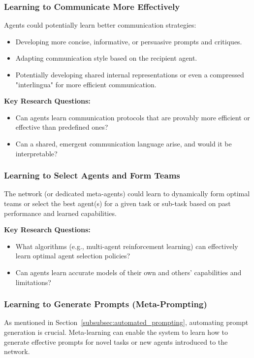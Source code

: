 \documentclass[12pt]{amsart}
\begin{document}
\subsubsection{Learning to Communicate More Effectively}
\label{subsubsec:learn_communication}
Agents could potentially learn better communication strategies:
\begin{itemize}[leftmargin=*]
    \item Developing more concise, informative, or persuasive prompts and critiques.
    \item Adapting communication style based on the recipient agent.
    \item Potentially developing shared internal representations or even a compressed "interlingua" for more efficient communication.
\end{itemize}
\textbf{Key Research Questions:}
\begin{itemize}[leftmargin=*, label={--}]
    \item Can agents learn communication protocols that are provably more efficient or effective than predefined ones?
    \item Can a shared, emergent communication language arise, and would it be interpretable?
\end{itemize}

\subsubsection{Learning to Select Agents and Form Teams}
\label{subsubsec:learn_selection}
The network (or dedicated meta-agents) could learn to dynamically form optimal teams or select the best agent(s) for a given task or sub-task based on past performance and learned capabilities.

\textbf{Key Research Questions:}
\begin{itemize}[leftmargin=*, label={--}]
    \item What algorithms (e.g., multi-agent reinforcement learning) can effectively learn optimal agent selection policies?
    \item Can agents learn accurate models of their own and others' capabilities and limitations?
\end{itemize}

\subsubsection{Learning to Generate Prompts (Meta-Prompting)}
\label{subsubsec:learn_prompts}
As mentioned in Section~\ref{subsubsec:automated_prompting}, automating prompt generation is crucial. Meta-learning can enable the system to learn how to generate effective prompts for novel tasks or new agents introduced to the network.
\end{document}
